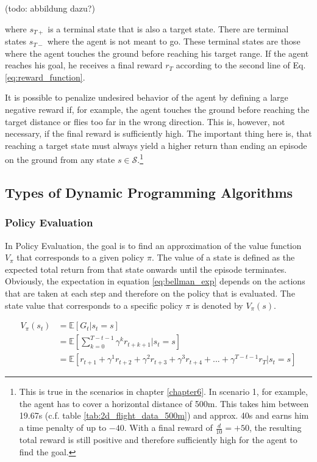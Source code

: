 (todo: abbildung dazu?)

where $s_{T+}$ is a terminal state that is also a target state. There are terminal states $s_{T-}$ where the agent is not meant to go. These terminal states are those where the agent touches the ground before reaching his target range. If the agent reaches his goal, he receives a final reward $r_T$ according to the second line of Eq. \ref{eq:reward_function}. 

It is possible to penalize undesired behavior of the agent by defining a large negative reward if, for example, the agent touches the ground before reaching the target distance or flies too far in the wrong direction. This is, however, not necessary, if the final reward is sufficiently high. The important thing here is, that reaching a target state must always yield a higher return than ending an episode on the ground from any state $s \in \mathcal{S}$.\footnote{This is true in the scenarios in chapter \ref{chapter6}. In scenario 1, for example, the agent has to cover a horizontal distance of 500m. This takes him between 19.67s (c.f. table \ref{tab:2d_flight_data_500m}) and approx. 40s and earns him a time penalty of up to $-40$. With a final reward of $\frac{d}{10}=+50$, the resulting total reward is still positive and therefore sufficiently high for the agent to find the goal.}

\subsection{Types of Dynamic Programming Algorithms}

\subsubsection{Policy Evaluation}
\label{subsection:policy_evaluation}

In Policy Evaluation, the goal is to find an approximation of the value function $V_\pi$ that corresponds to a given policy $\pi$. The value of a state is defined as the expected total return from that state onwards until the episode terminates. Obviously, the expectation in equation \ref{eq:bellman_exp} depends on the actions that are taken at each step and therefore on the policy that is evaluated. The state value that corresponds to a specific policy $\pi$ is denoted by $V_\pi(s)$.

\begin{align}
V_\pi(s_t)&=\mathbb{E}[G_t|s_t=s]\\ &= \mathbb{E}\left[ \sum_{k=0}^{T-t-1}\gamma^k r_{t+k+1}|s_t=s\right] \\
&=\mathbb{E}[r_{t+1}+\gamma^1 r_{t+2}+\gamma^2 r_{t+3}+\gamma^3 r_{t+4}+...+\gamma^{T-t-1}r_T|s_t=s]
\label{eq:bellman_exp}
\end{align}

